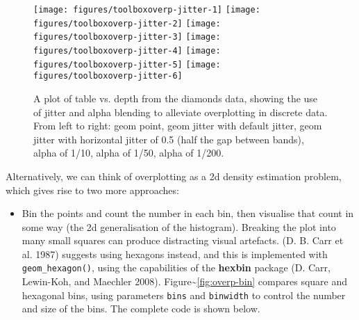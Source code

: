 \begin{figure}
\texttt{[image: figures/toolboxoverp-jitter-1]} \texttt{[image: figures/toolboxoverp-jitter-2]} \texttt{[image: figures/toolboxoverp-jitter-3]} \texttt{[image: figures/toolboxoverp-jitter-4]} \texttt{[image: figures/toolboxoverp-jitter-5]} \texttt{[image: figures/toolboxoverp-jitter-6]} \caption{A plot of table vs. depth from the diamonds data, showing the use of jitter and alpha blending to alleviate overplotting in discrete data. From left to right: geom point, geom jitter with default jitter, geom jitter with horizontal jitter of 0.5 (half the gap between bands), alpha of 1/10, alpha of 1/50, alpha of 1/200.\label{fig:overp-jitter}}
\end{figure}

Alternatively, we can think of overplotting as a 2d density estimation
problem, which gives rise to two more approaches:

\begin{itemize}
\itemsep1pt\parskip0pt
\item
  Bin the points and count the number in each bin, then visualise that
  count in some way (the 2d generalisation of the histogram). Breaking
  the plot into many small squares can produce distracting visual
  artefacts. (D. B. Carr et al. 1987) suggests using hexagons instead,
  and this is implemented with \texttt{geom\_hexagon()}, using the
  capabilities of the \textbf{hexbin} package (D. Carr, Lewin-Koh, and
  Maechler 2008). Figure\textasciitilde{}\ref{fig:overp-bin} compares
  square and hexagonal bins, using parameters \texttt{bins} and
  \texttt{binwidth} to control the number and size of the bins. The
  complete code is shown below. 
    
\end{itemize}

\begin{Shaded}
\begin{Highlighting}[]
\StringTok{ }\StringTok{ }\NormalTok{(}\NormalTok{, }\NormalTok{) +}
\StringTok{  }\NormalTok{(} \NormalTok{)}
\StringTok{ }\NormalTok{()}
\StringTok{ }\NormalTok{(} \NormalTok{)}
\StringTok{ }\NormalTok{(}\NormalTok{(}\NormalTok{, }\NormalTok{))}
\StringTok{ }\NormalTok{()}
\StringTok{ }\NormalTok{(} \NormalTok{)}
\StringTok{ }\NormalTok{(}\NormalTok{(}\NormalTok{, }\NormalTok{))}
\end{Highlighting}
\end{Shaded}

